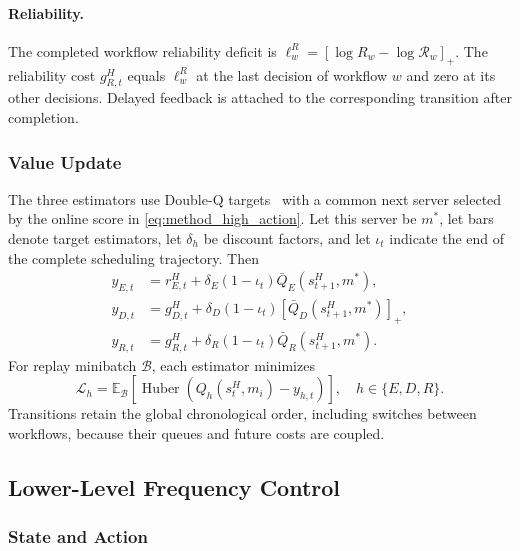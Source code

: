 \documentclass[10pt,twocolumn]{article}
\begin{document}
\paragraph{Reliability.}
The completed workflow reliability deficit is
$\ell_w^R=[\log R_w-\log\mathcal R_w]_+$.
The reliability cost $g_{R,t}^H$ equals $\ell_w^R$ at the last decision
of workflow $w$ and zero at its other decisions. Delayed feedback is
attached to the corresponding transition after completion.

\subsubsection{Value Update}

The three estimators use Double-Q targets~\cite{vanhasselt2016} with a
common next server selected by the online score in
\eqref{eq:method_high_action}. Let this server be $m^*$, let bars denote
target estimators, let $\delta_h$ be discount factors, and let $\iota_t$
indicate the end of the complete scheduling trajectory. Then
\begin{align}
 y_{E,t}&=r_{E,t}^H+\delta_E(1-\iota_t)\bar Q_E(s_{t+1}^H,m^*),\nonumber\\
 y_{D,t}&=g_{D,t}^H+\delta_D(1-\iota_t)[\bar Q_D(s_{t+1}^H,m^*)]_+,\nonumber\\
 y_{R,t}&=g_{R,t}^H+\delta_R(1-\iota_t)\bar Q_R(s_{t+1}^H,m^*).
 \label{eq:method_high_targets}
\end{align}
For replay minibatch $\mathcal B$, each estimator minimizes
\begin{equation}
 \mathcal L_h=\mathbb E_{\mathcal B}\left[
 \operatorname{Huber}\!\left(Q_h(s_t^H,m_i)-y_{h,t}\right)\right],
 \quad h\in\{E,D,R\}.
 \label{eq:method_high_loss}
\end{equation}
Transitions retain the
global chronological order, including switches between workflows,
because their queues and future costs are coupled.

\subsection{Lower-Level Frequency Control}
\label{subsec:low}

\subsubsection{State and Action}
\end{document}
